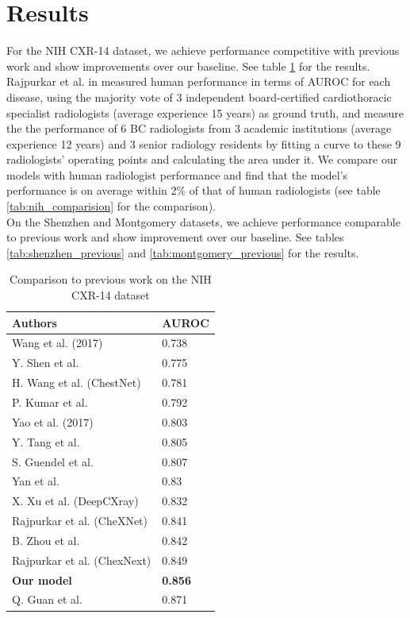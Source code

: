 \documentclass[oneside,a4paper]{article}
\begin{document}
\section{Results}
For the NIH CXR-14 dataset, we achieve performance competitive with previous
work and show improvements over our baseline. See table \ref{tab:nih_previous} for
the results. Rajpurkar et al. in \cite{Rajpurkar2018a} measured human
performance in terms of AUROC for each disease, using the majority vote of 3
independent board-certified cardiothoracic specialist radiologists (average
experience 15 years) as ground truth, and measure the the performance of 6 BC
radiologists from 3 academic institutions (average experience 12 years) and 3
senior radiology residents by fitting a curve to these 9 radiologists' operating
points and calculating the area under it. We compare our models with human
radiologist performance and find that the model's performance is on average
within 2\% of that of human radiologists (see table
\ref{tab:nih_comparision} for the comparison).\\

On the Shenzhen and Montgomery datasets, we achieve performance comparable to
previous work and show improvement over our baseline. See tables
\ref{tab:shenzhen_previous} and \ref{tab:montgomery_previous} for the results.

\begin{table}[]
  \centering
  \begin{tabular}{ll}
    \hline
    \textbf{Authors}            & \textbf{AUROC} \\ \hline
    Wang et al. (2017)          & 0.738                  \\ \hline
    Y. Shen et al.              & 0.775                  \\ \hline
    H. Wang et al. (ChestNet)   & 0.781                  \\ \hline
    P. Kumar et al.             & 0.792                  \\ \hline
    Yao et al. (2017)           & 0.803                  \\ \hline
    Y. Tang et al.              & 0.805                  \\ \hline
    S. Guendel et al.           & 0.807                  \\ \hline
    Yan et al.                  & 0.83                   \\ \hline
    X. Xu et al. (DeepCXray)    & 0.832                  \\ \hline
    Rajpurkar et al. (CheXNet)  & 0.841                  \\ \hline
    B. Zhou et al.              & 0.842                  \\ \hline
    Rajpurkar et al. (ChexNext) & 0.849                  \\ \hline
    \textbf{Our model}          & \textbf{0.856}         \\ \hline
    Q. Guan et al.              & 0.871                  \\ \hline
  \end{tabular}
  \caption{Comparison to previous work on the NIH CXR-14 dataset}
  \label{tab:nih_previous}
\end{table}
\end{document}
